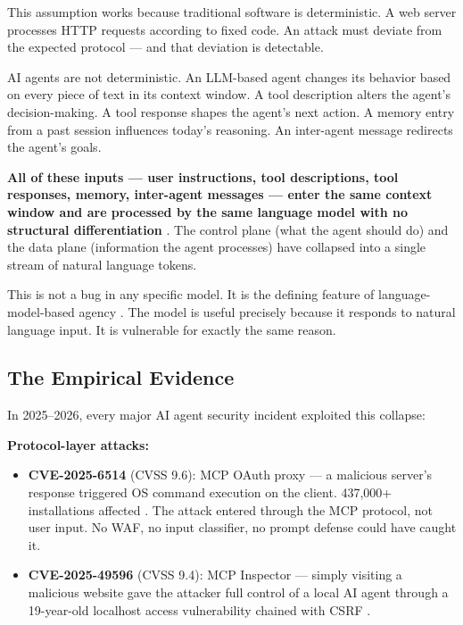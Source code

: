 \documentclass[11pt,letterpaper]{article}
\begin{document}
This assumption works because traditional software is deterministic. A web server processes HTTP requests according to fixed code. An attack must deviate from the expected protocol --- and that deviation is detectable.

AI agents are not deterministic. An LLM-based agent changes its behavior based on every piece of text in its context window. A tool description alters the agent's decision-making. A tool response shapes the agent's next action. A memory entry from a past session influences today's reasoning. An inter-agent message redirects the agent's goals.

\textbf{All of these inputs --- user instructions, tool descriptions, tool responses, memory, inter-agent messages --- enter the same context window and are processed by the same language model with no structural differentiation} \cite{kim2026,chhabra2025,survey2026}. The control plane (what the agent should do) and the data plane (information the agent processes) have collapsed into a single stream of natural language tokens.

This is not a bug in any specific model. It is the defining feature of language-model-based agency \cite{promptinjsurvey}. The model is useful precisely because it responds to natural language input. It is vulnerable for exactly the same reason.


\subsection{The Empirical Evidence}

In 2025--2026, every major AI agent security incident exploited this collapse:

\textbf{Protocol-layer attacks:}

\begin{itemize}
\item \textbf{CVE-2025-6514} (CVSS 9.6): MCP OAuth proxy --- a malicious server's response triggered OS command execution on the client. 437,000+ installations affected \cite{cve6514}. The attack entered through the MCP protocol, not user input. No WAF, no input classifier, no prompt defense could have caught it.
\item \textbf{CVE-2025-49596} (CVSS 9.4): MCP Inspector --- simply visiting a malicious website gave the attacker full control of a local AI agent through a 19-year-old localhost access vulnerability chained with CSRF \cite{cve49596}.
\end{itemize}
\end{document}
